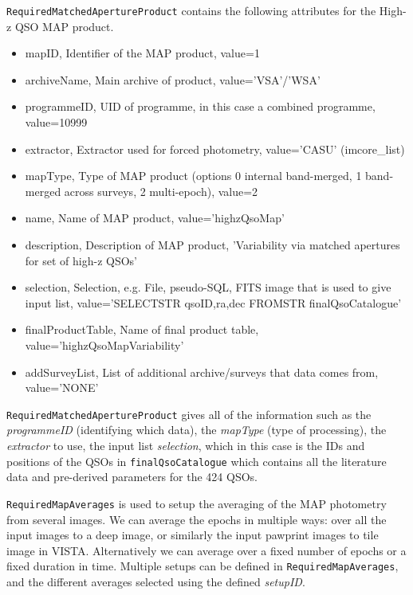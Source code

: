 \documentclass[usenatbib]{mnras}
\begin{document}
\verb+RequiredMatchedApertureProduct+ contains the following attributes for the High-z QSO MAP product.
\begin{itemize}
    \item mapID, Identifier of the MAP product, value=1	
    \item archiveName, Main archive of product, value='VSA'/'WSA' 	
    \item programmeID, UID of programme, in this case a combined programme, value=10999
    \item extractor, Extractor used for forced photometry, value='CASU' (imcore\_list)
    \item mapType, Type of MAP product (options 0 internal band-merged, 1 band-merged across surveys, 2 multi-epoch), value=2 
    \item name, Name of MAP product, value='highzQsoMap'
    \item description, Description of MAP product, 'Variability via matched apertures for set of high-z QSOs'	
    \item selection, Selection, e.g. File, pseudo-SQL, FITS image that is used to give input list, value='SELECTSTR qsoID,ra,dec FROMSTR finalQsoCatalogue'	
    \item finalProductTable, Name of final product table, value='highzQsoMapVariability'
    \item addSurveyList, List of additional archive/surveys that data comes from, value='NONE'
\end{itemize}
    
\verb+RequiredMatchedApertureProduct+ gives all of the information such as the {\it programmeID} (identifying which data), the {\it mapType} (type of processing), the {\it extractor} to use, the input list {\it selection}, which in this case is the IDs and positions of the QSOs in \verb+finalQsoCatalogue+ which contains all the literature data and pre-derived parameters for the 424 QSOs.   
    
\verb+RequiredMapAverages+ is used to setup the averaging of the MAP photometry from several images. We can average the epochs in multiple ways: over all the input images to a deep image, or similarly the input pawprint images to tile image in VISTA. Alternatively we can average over a fixed number of epochs or a fixed duration in time. Multiple setups can be defined in \verb+RequiredMapAverages+, and the different averages selected using the defined {\it setupID}.
    
\end{document}
